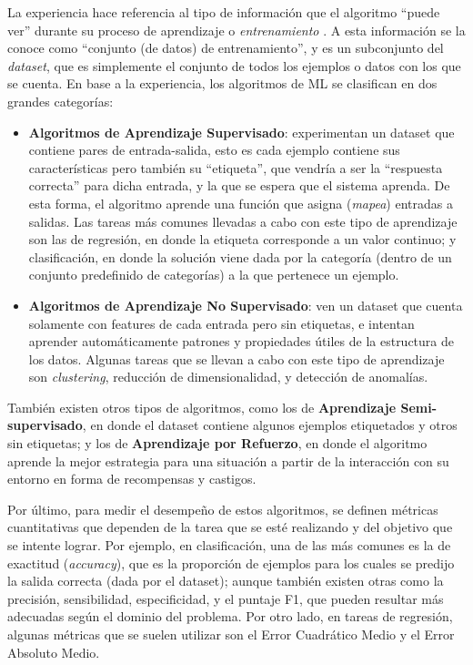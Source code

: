 \documentclass[../../main.tex]{subfiles}
\begin{document}
La experiencia hace referencia al tipo de información que el algoritmo ``puede ver''
durante su proceso de aprendizaje o \textit{entrenamiento} \cite{hands-on-ML-sklearn-tf}.
A esta información se la conoce como ``conjunto (de datos) de entrenamiento'', y es un
subconjunto del \textit{dataset}, que es simplemente el conjunto de todos los ejemplos o
datos con los que se cuenta. En base a la experiencia, los algoritmos de ML se clasifican
en dos grandes categorías:
\begin{itemize}
    \item \textbf{Algoritmos de Aprendizaje Supervisado}: experimentan un dataset que
    contiene pares de entrada-salida, esto es cada ejemplo contiene sus características pero
    también su ``etiqueta'', que vendría a ser la ``respuesta correcta'' para dicha
    entrada, y la que se espera que el sistema aprenda. De esta forma, el algoritmo
    aprende una función que asigna (\textit{mapea}) entradas a salidas. Las tareas más
    comunes llevadas a cabo con este tipo de aprendizaje son las de regresión, en donde la
    etiqueta corresponde a un valor continuo; y clasificación, en donde la solución viene
    dada por la categoría (dentro de un conjunto predefinido de categorías) a la que
    pertenece un ejemplo.
    \item \textbf{Algoritmos de Aprendizaje No Supervisado}: ven un dataset que cuenta
    solamente con features de cada entrada pero sin etiquetas, e intentan aprender
    automáticamente patrones y propiedades útiles de la estructura de los datos. Algunas
    tareas que se llevan a cabo con este tipo de aprendizaje son \textit{clustering},
    reducción de dimensionalidad, y detección de anomalías.
\end{itemize}
También existen otros tipos de algoritmos, como los de \textbf{Aprendizaje
Semi-supervisado}, en donde el dataset contiene algunos ejemplos etiquetados y otros sin
etiquetas; y los de \textbf{Aprendizaje por Refuerzo}, en donde el algoritmo aprende la
mejor estrategia para una situación a partir de la interacción con su entorno en forma de
recompensas y castigos.

Por último, para medir el desempeño de estos algoritmos, se definen métricas cuantitativas
que dependen de la tarea que se esté realizando y del objetivo que se intente lograr. Por
ejemplo, en clasificación, una de las más comunes es la de exactitud (\textit{accuracy}),
que es la proporción de ejemplos para los cuales se predijo la salida correcta (dada por
el dataset); aunque también existen otras como la precisión, sensibilidad, especificidad,
y el puntaje F1, que pueden resultar más adecuadas según el dominio del
problema. Por otro lado, en tareas de regresión, algunas métricas que se suelen
utilizar son el Error Cuadrático Medio y el Error Absoluto Medio.
\end{document}
